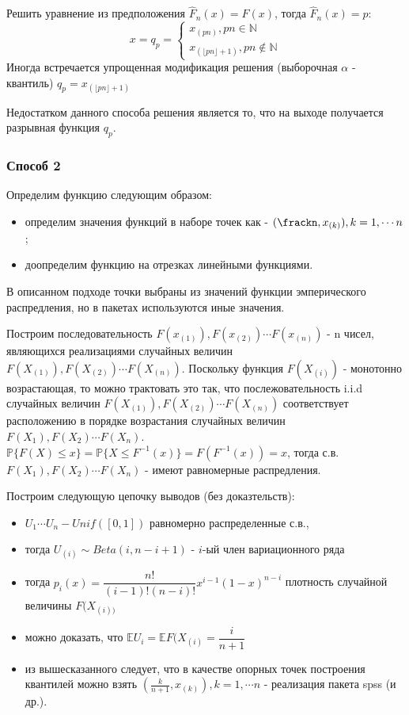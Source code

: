 \documentclass[a4 paper]{article}
\begin{document}
Решить уравнение из предположения $\hat{F}_n (x) = F(x)$, тогда $\hat{F}_n (x) = p$:
\begin{equation*}
x = q_p = 
 \begin{cases}
   x_{(pn)}, pn \in \mathbb{N} \\
   x_{(\lfloor pn \rfloor + 1)}, pn \notin \mathbb{N}
 \end{cases}
\end{equation*}
Иногда встречается упрощенная модификация решения (выборочная $\alpha$ - квантиль) $q_p = x_{(\lfloor pn \rfloor + 1)}$

Недостатком данного способа решения является то, что на выходе получается разрывная функция $q_p$.

\subsubsection{Способ 2}
Определим функцию следующим образом:
\begin{itemize}
    \item определим значения функций в наборе точек как - $(\frackn, x_{(k)}), k = 1, \cdots n$;
    \item доопределим функцию на отрезках линейными функциями.
\end{itemize}
В описанном подходе точки выбраны из значений функции эмперического распредления, но в пакетах используются иные значения. 

Построим последовательность $F(x_{(1)}),F(x_{(2)}) \cdots F(x_{(n)})$ - n чисел, являющихся реализациями случайных величин $F(X_{(1)}),F(X_{(2)}) \cdots F(X_{(n)})$. Поскольку функция $F(X_{(i)})$ - монотонно возрастающая, то можно трактовать это так, что послежовательность i.i.d случайных величин $F(X_{(1)}),F(X_{(2)}) \cdots F(X_{(n)})$ соответствует расположению в порядке возрастания случайных величин  $F(X_1),F(X_2) \cdots F(X_n)$. $\mathbb{P}\{F(X) \leq x\} = \mathbb{P}\{X \leq F^{-1}(x)\} = F(F^{-1}(x)) = x$, тогда с.в. $F(X_1),F(X_2) \cdots F(X_n)$ - имеют равномерные распредления.

Построим следующую цепочку выводов (без доказтельств):
\begin{itemize}
    \item $U_1 \cdots U_n - Unif([0,1])$ равномерно распределенные с.в.,
    \item тогда $U_{(i)} \sim Beta(i, n-i + 1)$ - $i$-ый член вариационного ряда
    \item тогда $p_i(x) = \dfrac{n!}{(i-1)!(n-i)!}x^{i-1}(1-x)^{n-i}$ плотность случайной величины $F(X_{(i))}$
    \item можно доказать, что $\mathbb{E}U_i = \mathbb{E}F(X_{(i)} = \dfrac{i}{n+1}$
    \item из вышесказанного следует, что в качестве опорных точек построения квантилей можно взять $(\frac{k}{n+1}, x_{(k)}), k = 1, \cdots n$ - реализация пакета spss (и др.).
\end{itemize}
\end{document}
